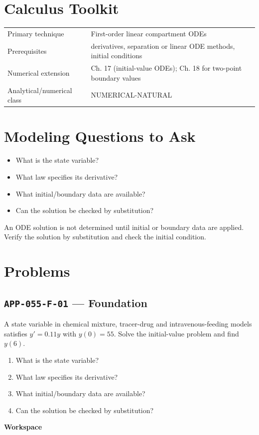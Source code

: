 \documentclass[11pt]{book}
\newcommand{\pid}[1]{\texttt{#1}}
\newcommand{\workspace}{\par\vspace{0.7in}\hrulefill\par\vspace{0.55in}\hrulefill\par}
\begin{document}
\section*{Calculus Toolkit}
\begin{tabularx}{\textwidth}{@{}lX@{}}\toprule
Primary technique & First-order linear compartment ODEs \\
Prerequisites & derivatives, separation or linear ODE methods, initial conditions \\
Numerical extension & Ch. 17 (initial-value ODEs); Ch. 18 for two-point boundary values \\
Analytical/numerical class & NUMERICAL-NATURAL \\
\bottomrule\end{tabularx}
\section*{Modeling Questions to Ask}\begin{itemize}
\item What is the state variable?
\item What law specifies its derivative?
\item What initial/boundary data are available?
\item Can the solution be checked by substitution?
\end{itemize}
\begin{errorbox}An ODE solution is not determined until initial or boundary data are applied. Verify the solution by substitution and check the initial condition.\end{errorbox}
\section*{Problems}
\subsection*{\pid{APP-055-F-01} — Foundation}
\begin{problembox}
A state variable in chemical mixture, tracer-drug and intravenous-feeding models satisfies $y'=0.11y$ with $y(0)=55$. Solve the initial-value problem and find $y(6)$.
\end{problembox}
\begin{promptbox}\begin{enumerate}
\item What is the state variable?
\item What law specifies its derivative?
\item What initial/boundary data are available?
\item Can the solution be checked by substitution?
\end{enumerate}\end{promptbox}
\textbf{Workspace}\workspace
{}
\end{document}

